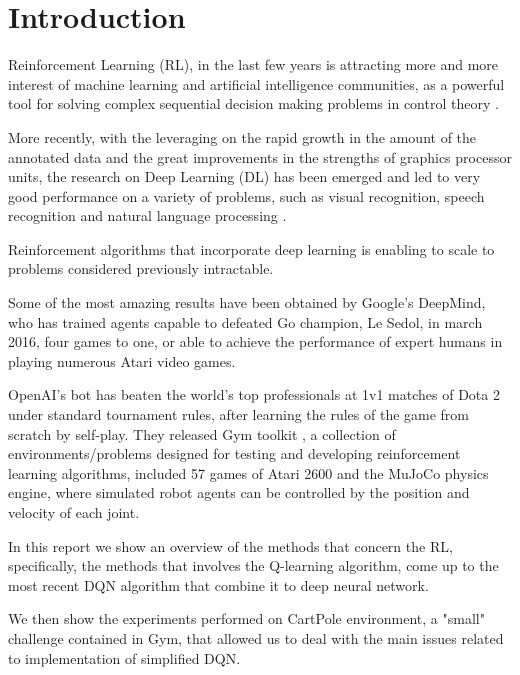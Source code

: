 \section{Introduction}

Reinforcement Learning (RL), in the last few years is attracting more and more interest of machine learning and artificial intelligence communities, as a powerful tool for solving complex sequential decision making problems in control theory \cite{GosaviRLSurvey}.

More recently, with the leveraging on the rapid growth in the amount of the annotated data and the great improvements in the strengths of graphics processor units, the research on  Deep Learning (DL) has been emerged and led to very good performance on a variety of problems, such as visual recognition, speech recognition and natural language processing \cite{AdvancesCNN}.

Reinforcement algorithms that incorporate deep learning is enabling to scale to problems considered previously intractable.

Some of the most amazing results have been obtained by Google’s DeepMind, who has trained agents capable to defeated Go champion, Le Sedol, in march 2016, four games to one, or able to achieve the performance of expert humans in playing numerous Atari video games.

OpenAI's bot has beaten the world's top professionals at 1v1 matches of Dota 2 under standard tournament rules, after learning the rules of the game from scratch by self-play.
They released Gym toolkit \cite{Gym}, a collection of environments/problems designed for testing and developing reinforcement learning algorithms, included 57 games of Atari 2600 and the MuJoCo physics engine, where simulated robot agents can be controlled by the position and velocity of each joint. 

In this report we show an overview of the methods that concern the RL, specifically, the methods that involves the Q-learning algorithm, come up to the most recent DQN algorithm that combine it to deep neural network.

We then show the experiments performed on CartPole environment, a "small" challenge contained in Gym, that allowed us to deal with the main issues related to implementation of simplified DQN.
